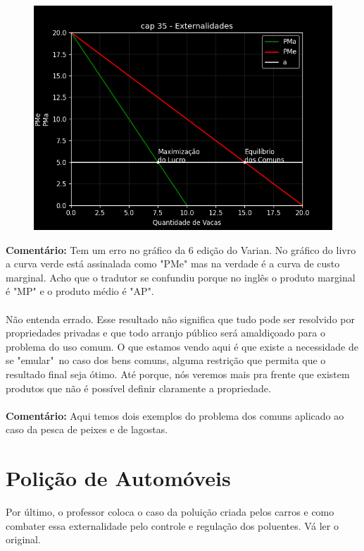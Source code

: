 \documentclass[a4paper,11pt,oneside]{book}
\theoremstyle{definition}
\theoremstyle{break}
\begin{document}
\begin{figure}[H]
	\centering
	\includegraphics[scale=0.7]{cap35_6-tragedia_comum.png}
\end{figure}

\textbf{Comentário:} Tem um erro no gráfico da 6 edição do Varian. No gráfico do livro a curva verde está assinalada como "PMe" mas na verdade é a curva de custo marginal. Acho que o tradutor se confundiu porque no inglês o produto marginal é "MP" e o produto médio é "AP".
\\
\\
Não entenda errado. Esse resultado não significa que tudo pode ser resolvido por propriedades privadas e que todo arranjo público será amaldiçoado para o problema do uso comum. O que estamos vendo aqui é que existe a necessidade de se "emular"\ no caso dos bens comuns, alguma restrição que permita que o resultado final seja ótimo. Até porque, nós veremos mais pra frente que existem produtos que não é possível definir claramente a propriedade.
\\
\\
\textbf{Comentário: } Aqui temos dois exemplos do problema dos comuns aplicado ao caso da pesca de peixes e de lagostas.

\section{Polição de Automóveis}

Por último, o professor coloca o caso da poluição criada pelos carros e como combater essa externalidade pelo controle e regulação dos poluentes. Vá ler o original.
\end{document}
